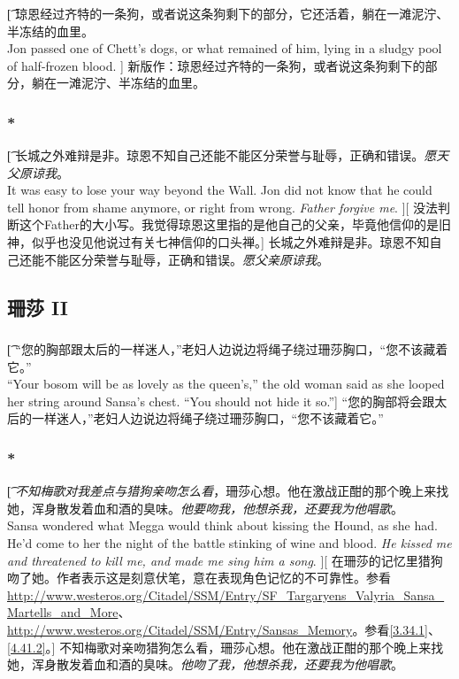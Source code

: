 \documentclass[12pt,a4paper]{article}
\begin{document}
\subsubsection{}\t[
	琼恩经过齐特的一条狗，或者说这条狗剩下的部分，它还活着，躺在一滩泥泞、半冻结的血里。\\
	Jon passed one of Chett's dogs, or what remained of him, lying in a sludgy pool of half-frozen blood. ]
	新版作：琼恩经过齐特的一条狗，或者说这条狗剩下的部分，躺在一滩泥泞、半冻结的血里。
	
\subsubsection{\color{red}*}\t[
	长城之外难辩是非。琼恩不知自己还能不能区分荣誉与耻辱，正确和错误。\emph{愿天父原谅我}。\\
	It was easy to lose your way beyond the Wall. Jon did not know that he could tell honor from shame anymore, or right from wrong. \emph{Father forgive me}. ][
	没法判断这个Father的大小写。我觉得琼恩这里指的是他自己的父亲，毕竟他信仰的是旧神，似乎也没见他说过有关七神信仰的口头禅。]
	长城之外难辩是非。琼恩不知自己还能不能区分荣誉与耻辱，正确和错误。\emph{愿父亲原谅我}。
	
\subsection{珊莎 II}
\subsubsection{}\t[
	 “您的胸部跟太后的一样迷人，”老妇人边说边将绳子绕过珊莎胸口，“您不该藏着它。” \\
	 “Your bosom will be as lovely as the queen's,” the old woman said as she looped her string around Sansa's chest. “You should not hide it so.”]
	 “您的胸部将会跟太后的一样迷人，”老妇人边说边将绳子绕过珊莎胸口，“您不该藏着它。” 
	 
\subsubsection{\color{red}*}\label{3.16.2}\t[
	\emph{不知梅歌对我差点与猎狗亲吻怎么看}，珊莎心想。他在激战正酣的那个晚上来找她，浑身散发着血和酒的臭味。\emph{他要吻我，他想杀我，还要我为他唱歌}。\\
	Sansa wondered what Megga would think about kissing the Hound, as she had. He'd come to her the night of the battle stinking of wine and blood. \emph{He kissed me and threatened to kill me, and made me sing him a song}. ][
	在珊莎的记忆里猎狗吻了她。作者表示这是刻意伏笔，意在表现角色记忆的不可靠性。参看\url{http://www.westeros.org/Citadel/SSM/Entry/SF_Targaryens_Valyria_Sansa_Martells_and_More}、\url{http://www.westeros.org/Citadel/SSM/Entry/Sansas_Memory}。参看\ref{3.34.1}、\ref{4.41.2}。]
	不知梅歌对亲吻猎狗怎么看，珊莎心想。他在激战正酣的那个晚上来找她，浑身散发着血和酒的臭味。\emph{他吻了我，他想杀我，还要我为他唱歌}。
	
\end{document}
